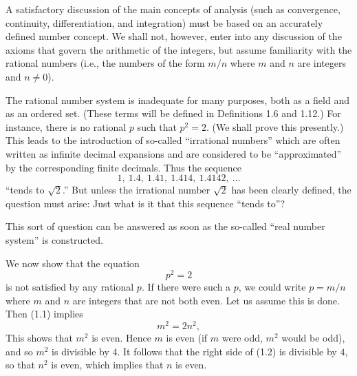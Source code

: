 
\noindent
A satisfactory discussion of the main concepts of analysis (such as convergence,
continuity, differentiation, and integration) must be based on an accurately
defined number concept. We shall not, however, enter into any discussion of the
axioms that govern the arithmetic of the integers, but assume familiarity with
the rational numbers (i.e., the numbers of the form $m/n$ where $m$ and $n$ are
integers and $n \ne 0$).

The rational number system is inadequate for many purposes, both as a field and
as an ordered set. (These terms will be defined in Definitions 1.6 and 1.12.)
For instance, there is no rational $p$ such that $p^2 = 2$. (We shall prove this
presently.) This leads to the introduction of so-called ``irrational numbers''
which are often written as infinite decimal expansions and are considered to be
``approximated'' by the corresponding finite decimals. Thus the sequence
\[ 1,\ 1.4,\ 1.41,\ 1.414,\ 1.4142,\ \dots \]
``tends to $\sqrt 2$.'' But unless the irrational number $\sqrt 2$ has been clearly
defined, the question must arise: Just what is it that this sequence ``tends
to''?

This sort of question can be answered as soon as the so-called ``real number
system'' is constructed.

We now show that the equation
\begin{equation}
  p^2 = 2 \tag{1.1}
\end{equation}
is not satisfied by any rational $p$. If there were such a $p$, we could write
$p = m/n$ where $m$ and $n$ are integers that are not both even. Let us assume this is done. Then (1.1) implies
\begin{equation}
  m^2 = 2n^2, \tag{1.2}
\end{equation}
This shows that $m^2$ is even. Hence $m$ is even (if $m$ were odd, $m^2$ would
be odd), and so $m^2$ is divisible by $4$. It follows that the right side of
(1.2) is divisible by $4$, so that $n^2$ is even, which implies that $n$ is
even.

